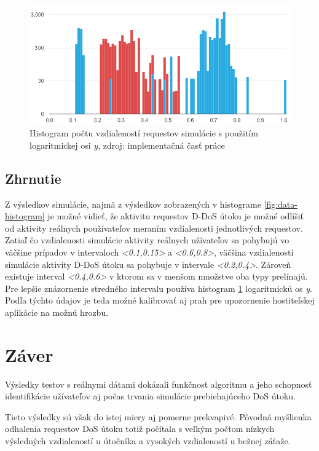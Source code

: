 \documentclass[
  printed, %
  table,   %
  lof,     %
  nolot,   %
  nocover
]{fithesis3}
\begin{document}
\begin{figure}[h]
  \centering
    \includegraphics[width=\textwidth]{images/data-histogram-log.png}
  \caption{Histogram počtu vzdialeností requestov simulácie s použitím logaritmickej
  osi \textit{y}, zdroj: implementačná časť práce}
  \label{fig:data-histogram-log}
\end{figure}

\section{Zhrnutie}
Z výsledkov simulácie, najmä z výsledkov zobrazených v histograme
\ref{fig:data-histogram} je možné vidieť, že aktivitu requestov D-DoS útoku je
možné odlíšiť od aktivity reálnych používateľov meraním vzdialenosti
jednotlivých requestov. Zatiaľ čo vzdialenosti simulácie aktivity reálnych
užívateľov sa pohybujú vo väčšine prípadov v intervaloch \textit{<0.1,0.15>} a \textit{<0.6,0.8>},
väčšina vzdialeností simulácie aktivity D-DoS útoku sa pohybuje v intervale
\textit{<0.2,0.4>}. Zároveň existuje interval \textit{<0.4,0.6>} v ktorom sa v menšom
množstve oba typy prelínajú. Pre lepšie znázornenie stredného intervalu používa
histogram \ref{fig:data-histogram-log} logaritmickú os \textit{y}.
Podľa týchto údajov je teda možné kalibrovať aj prah pre
upozornenie hostiteľskej aplikácie na možnú hrozbu. 

\chapter{Záver}
Výsledky testov s reálnymi dátami dokázali funkčnosť algoritmu a jeho schopnosť
identifikácie užívateľov aj počas trvania simulácie prebiehajúceho DoS útoku.

Tieto výsledky sú však do istej miery aj pomerne prekvapivé. Pôvodná myšlienka
odhalenia requestov DoS útoku totiž počítala s veľkým počtom nízkych výsledných
vzdialeností u útočníka a vysokých vzdialeností u bežnej záťaže. 
\end{document}
